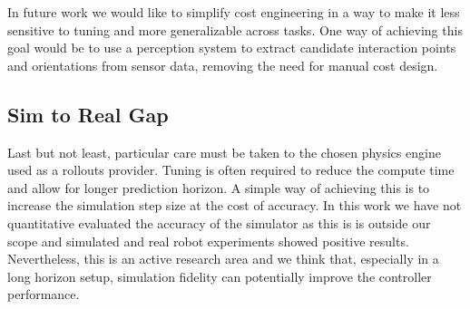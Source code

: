 In future work we would like to simplify cost engineering in a way to make it less sensitive to tuning and more generalizable across tasks. One way of achieving this goal would be to use a perception system to extract candidate interaction points and orientations from sensor data, removing the need for manual cost design. 

\subsection{Sim to Real Gap}
Last but not least, particular care must be taken to the chosen physics engine used as a rollouts provider. Tuning is often required to reduce the compute time and allow for longer prediction horizon. A simple way of achieving this is to increase the simulation step size at the cost of accuracy. In this work we have not quantitative evaluated the accuracy of the simulator as this is is outside our scope and simulated and real robot experiments showed positive results. Nevertheless, this is an active research area and we think that, especially in a long horizon setup, simulation fidelity can potentially improve the controller performance. 
